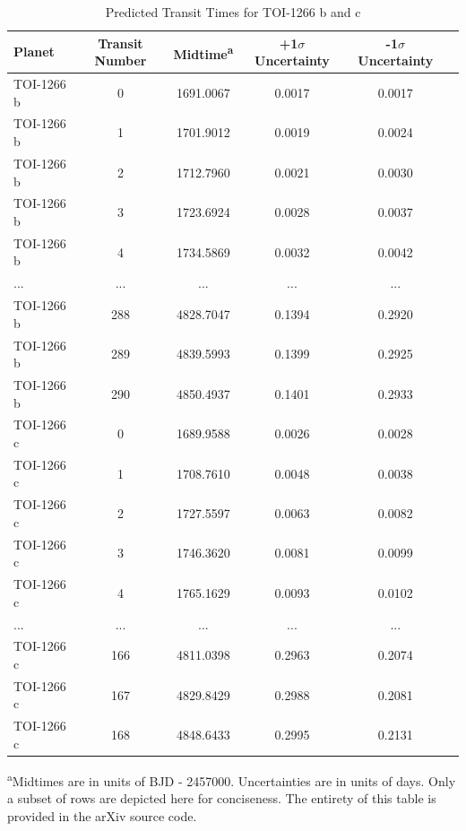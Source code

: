 \documentclass[twocolumn]{aastex631}
\begin{document}
\begin{table}[htbp]
\centering
\caption{Predicted Transit Times for TOI-1266 b and c}
\small
\begin{tabular}{lccccc}
\hline
Planet & Transit Number & Midtime\textsuperscript{a} & +1$\sigma$ Uncertainty & -1$\sigma$ Uncertainty \\
\hline
TOI-1266 b & 0 & 1691.0067 & 0.0017 & 0.0017 \\
TOI-1266 b & 1 & 1701.9012 & 0.0019 & 0.0024 \\
TOI-1266 b & 2 & 1712.7960 & 0.0021 & 0.0030 \\
TOI-1266 b & 3 & 1723.6924 & 0.0028 & 0.0037 \\
TOI-1266 b & 4 & 1734.5869 & 0.0032 & 0.0042 \\
... & ... & ... & ... & ... \\
TOI-1266 b & 288 & 4828.7047 & 0.1394 & 0.2920 \\
TOI-1266 b & 289 & 4839.5993 & 0.1399 & 0.2925 \\
TOI-1266 b & 290 & 4850.4937 & 0.1401 & 0.2933 \\
\hline
TOI-1266 c & 0 & 1689.9588 & 0.0026 & 0.0028 \\
TOI-1266 c & 1 & 1708.7610 & 0.0048 & 0.0038 \\
TOI-1266 c & 2 & 1727.5597 & 0.0063 & 0.0082 \\
TOI-1266 c & 3 & 1746.3620 & 0.0081 & 0.0099 \\
TOI-1266 c & 4 & 1765.1629 & 0.0093 & 0.0102 \\
... & ... & ... & ... & ... \\
TOI-1266 c & 166 & 4811.0398 & 0.2963 & 0.2074 \\
TOI-1266 c & 167 & 4829.8429 & 0.2988 & 0.2081 \\
TOI-1266 c & 168 & 4848.6433 & 0.2995 & 0.2131 \\
\hline
\end{tabular}
\label{tab:Predicted transits}
\vspace{0.5cm}
\footnotesize
\begin{flushleft}
\textsuperscript{a}Midtimes are in units of BJD - 2457000. Uncertainties are in units of days. Only a subset of rows are depicted here for conciseness. The entirety of this table is provided in the arXiv source code.
\end{flushleft}
\end{table}

\end{document}
